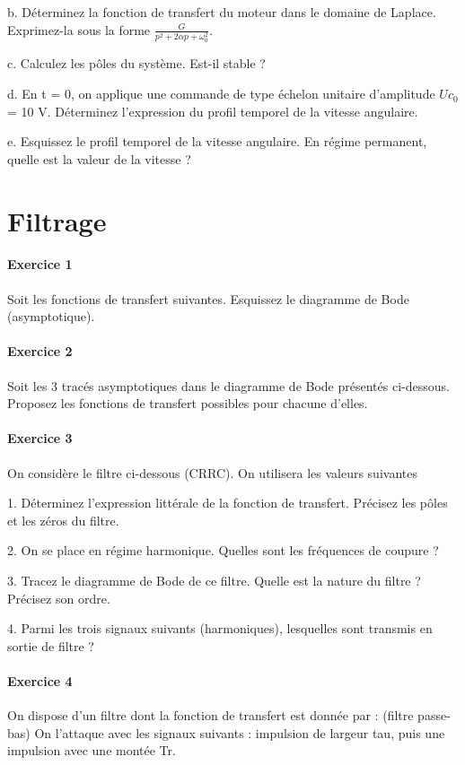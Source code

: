 \documentclass[11pt]{report}
\begin{document}
	b. Déterminez la fonction de transfert du moteur dans le domaine de Laplace. Exprimez-la sous la forme $\frac{G}{p^{2}+2\alpha p+\omega_{0}^{2}}$.
	
	c. Calculez les pôles du système. Est-il stable ?
	
	d. En t = 0, on applique une commande de type échelon unitaire d'amplitude $Uc_{0}$ = 10 V. Déterminez l'expression du profil temporel de la vitesse angulaire.
	
	e. Esquissez le profil temporel de la vitesse angulaire. En régime permanent, quelle est la valeur de la vitesse ? 
	
	
	\newpage
	
	\chapter{Filtrage}
	
	\subsubsection{Exercice 1}
	Soit les fonctions de transfert suivantes. Esquissez le diagramme de Bode (asymptotique). 
	
	\subsubsection{Exercice 2}
	Soit les 3 tracés asymptotiques dans le diagramme de Bode présentés ci-dessous. Proposez les fonctions de transfert possibles pour chacune d'elles. 
	
	
	\subsubsection{Exercice 3}
	On considère le filtre ci-dessous (CRRC). On utilisera les valeurs suivantes
	
	1. Déterminez l'expression littérale de la fonction de transfert. Précisez les pôles et les zéros du filtre.
	
	2. On se place en régime harmonique. Quelles sont les fréquences de coupure ?
	
	3. Tracez le diagramme de Bode de ce filtre. Quelle est la nature du filtre ? Précisez son ordre.
	
	4. Parmi les trois signaux suivants (harmoniques), lesquelles sont transmis en sortie de filtre ?
	
	\subsubsection{Exercice 4}
	On dispose d'un filtre dont la fonction de transfert est donnée par : (filtre passe-bas)
	On l'attaque avec les signaux suivants : impulsion de largeur tau, puis une impulsion avec une montée Tr.
	
\end{document}
